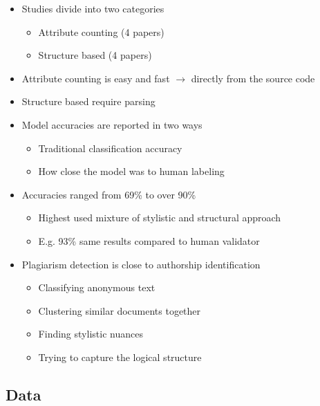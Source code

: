 \documentclass[t,12pt,pdftex]{beamer}
\begin{document}
\begin{frame}
	\vspace{0.5in}
	\begin{itemize}
		\item Studies divide into two categories
		\begin{itemize}
			\item Attribute counting (4 papers)
			\item Structure based (4 papers)
		\end{itemize}
		\item Attribute counting is easy and fast $\rightarrow$ directly from the source code
		\item Structure based require parsing
		\item Model accuracies are reported in two ways
		\begin{itemize}
			\item Traditional classification accuracy
			\item How close the model was to human labeling
		\end{itemize}
	\end{itemize}
\end{frame}

\begin{frame}
	\vspace{0.5in}
	\begin{itemize}
		\item Accuracies ranged from 69\% to over 90\%
		\begin{itemize}
			\item Highest used mixture of stylistic and structural approach
			\item E.g. 93\% same results compared to human validator
		\end{itemize}
		\item Plagiarism detection is close to authorship identification
			\begin{itemize}
			\item Classifying anonymous text
			\item Clustering similar documents together
			\item Finding stylistic nuances
			\item Trying to capture the logical structure
		\end{itemize}
	\end{itemize}
\end{frame}

\subsection{Data}
\end{document}
